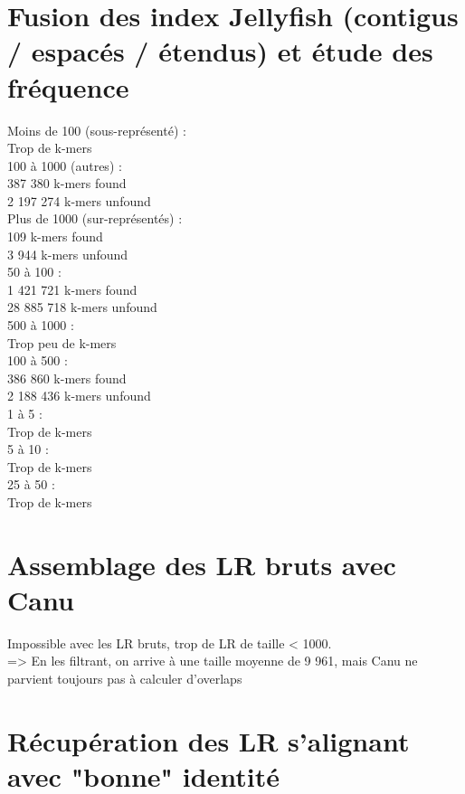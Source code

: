 \documentclass[12pt]{article}
\begin{document}
\section{Fusion des index Jellyfish (contigus / espacés / étendus) et étude des fréquence}

Moins de 100 (sous-représenté) : \\
Trop de k-mers \\

100 à 1000 (autres) : \\
387 380 k-mers found \\
2 197 274 k-mers unfound \\

Plus de 1000 (sur-représentés) : \\
109 k-mers found \\
3 944 k-mers unfound \\

50 à 100 : \\
1 421 721 k-mers found \\
28 885 718 k-mers unfound \\

500 à 1000 : \\
Trop peu de k-mers \\

100 à 500 : \\

386 860 k-mers found \\
2 188 436 k-mers unfound \\

1 à 5 : \\
Trop de k-mers  \\

5 à 10 : \\
Trop de k-mers \\

25 à 50 : \\
Trop de k-mers \\

\section{Assemblage des LR bruts avec Canu}

Impossible avec les LR bruts, trop de LR de taille < 1000. \\
=> En les filtrant, on arrive à une taille moyenne de 9 961, mais Canu ne parvient toujours pas à calculer d'overlaps

\section{Récupération des LR s'alignant avec "bonne" identité}
\end{document}
